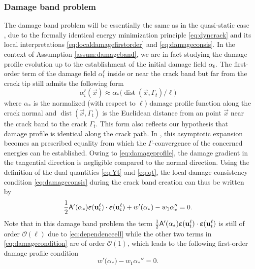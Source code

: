 \subsubsection{Damage band problem}
The damage band problem will be essentially the same as in the quasi-static case \cite{SicsicMarigo:2013}, due to the formally identical energy minimization principle \eqref{eq:dyncrack} and its local interpretations \eqref{eq:localdamagefirstorder} and \eqref{eq:damageconsis}. In the context of Assumption \ref{assum:damageband}, we are in fact studying the damage profile evolution up to the establishment of the initial damage field $\alpha_0$. The first-order term of the damage field $\alpha_t^\ell$ inside or near the crack band but far from the crack tip still admits the following form
\begin{equation} \label{eq:damageprofile}
\alpha_t^\ell(\vec{x})\approx\alpha_*\bigl(\operatorname{dist}(\vec{x},\Gamma_t)/\ell\bigr)
\end{equation}
where $\alpha_*$ is the normalized (with respect to $\ell$) damage profile function along the crack normal and $\operatorname{dist}(\vec{x},\Gamma_t)$ is the Euclidean distance from an point $\vec{x}$ near the crack band to the crack $\Gamma_t$. This form also reflects our hypothesis that damage profile is identical along the crack path. In \cite{Negri:2013}, this asymptotic expansion becomes an prescribed equality from which the $\Gamma$-convergence of the concerned energies can be established. Owing to \eqref{eq:damageprofile}, the damage gradient in the tangential direction is negligible compared to the normal direction. Using the definition of the dual quantities \eqref{eq:Yt} and \eqref{eq:qt}, the local damage consistency condition \eqref{eq:damageconsis} during the crack band creation can thus be written by
\begin{equation} \label{eq:damagecondition}
\frac{1}{2}\tens{A}'(\alpha_*)\eps(\vec{u}_t^\ell)\cdot\eps(\vec{u}_t^\ell)+w'(\alpha_*)-w_1\alpha_*''=0.
\end{equation}
Note that in this damage band problem the term $\frac{1}{2}\tens{A}'(\alpha_*)\eps(\vec{u}_t^\ell)\cdot\eps(\vec{u}_t^\ell)$ is still of order $\mathcal{O}(\ell)$ due to \eqref{eq:dependenceell} while the other two terms in \eqref{eq:damagecondition} are of order $\mathcal{O}(1)$, which leads to the following first-order damage profile condition
\begin{equation} \label{eq:firstorderdamagecondition}
w'\bigl(\alpha_*\bigr)-w_1\alpha_*''=0.
\end{equation}

